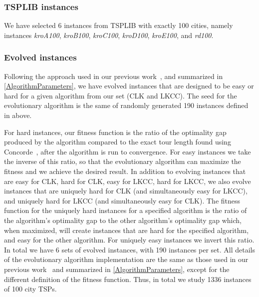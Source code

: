 \documentclass[conference]{IEEEtran}
\begin{document}
\subsubsection{TSPLIB instances}
We have selected 6 instances from TSPLIB with exactly 100 cities, namely instances \emph{kroA100}, \emph{kroB100}, \emph{kroC100}, \emph{kroD100}, \emph{kroE100}, and \emph{rd100}.
\subsubsection{Evolved instances}
Following the approach used in our previous work~\cite{AMAI}, and summarized in \autoref{AlgorithmParameters}, we have evolved instances that are designed to be easy or hard for a given algorithm from our set (CLK and LKCC). The seed for the evolutionary algorithm is the same of randomly generated 190 instances defined in \emph{\hyperref[thisplace]{\thissubsubsection}} above.

For hard instances, our fitness function is the ratio of the optimality gap produced by the algorithm compared to the exact tour length found using Concorde~\cite{Concorde}, after the algorithm is run to convergence. For easy instances we take the inverse of this ratio, so that the evolutionary algorithm can maximize the fitness and we achieve the desired result. In addition to evolving instances that are easy for CLK, hard for CLK, easy for LKCC, hard for LKCC, we also evolve instances that are uniquely hard for CLK (and simultaneously easy for LKCC), and uniquely hard for LKCC (and simultaneously easy for CLK). The fitness function for the uniquely hard instances for a specified algorithm is the ratio of the algorithm's optimality gap to the other algorithm's optimality gap which, when maximized, will create instances that are hard for the specified algorithm, and easy for the other algorithm. For uniquely easy instances we invert this ratio. In total we have 6 sets of evolved instances, with 190 instances per set. All details of the evolutionary algorithm implementation are the same as those used in our previous work~\cite{AMAI} and summarized in \autoref{AlgorithmParameters}, except for the different definition of the fitness function. Thus, in total we study 1336 instances of 100 city TSPs.
\end{document}
